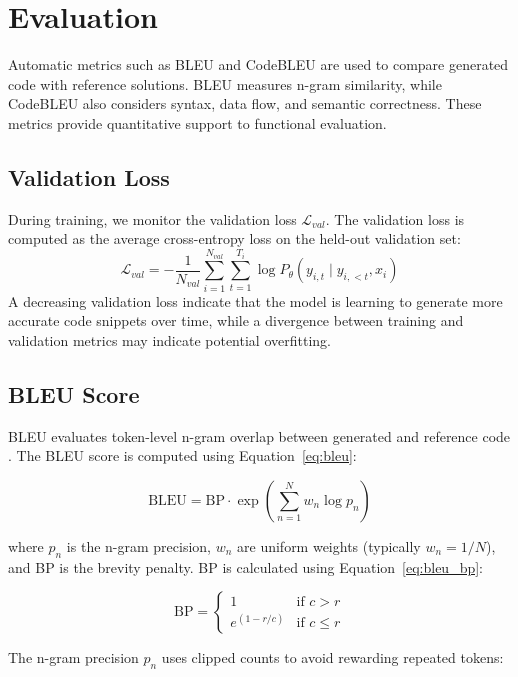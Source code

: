 \section{Evaluation}
Automatic metrics such as BLEU and CodeBLEU are used to compare generated code
with reference solutions. BLEU measures n-gram similarity, while CodeBLEU also
considers syntax, data flow, and semantic correctness. These metrics provide quantitative
support to functional evaluation.
\subsection{Validation Loss}
During training, we monitor the validation loss $\mathcal{L}_{val}$. The validation loss is computed as the average cross-entropy loss on the held-out validation set:
\begin{equation}
\mathcal{L}_{val} = - \frac{1}{N_{val}} \sum_{i=1}^{N_{val}} \sum_{t=1}^{T_i} \log P_\theta(y_{i,t} \mid y_{i,<t}, x_i)
\end{equation}
A decreasing validation loss indicate that the model is learning to generate more accurate code snippets over time, while a divergence between training and validation metrics may indicate potential overfitting.

\subsection{BLEU Score}
BLEU evaluates token-level n-gram overlap between generated and reference code \cite{Papineni2002}. 
The BLEU score is computed using Equation~\eqref{eq:bleu}:

\begin{equation}\label{eq:bleu}
	\text{BLEU} = \text{BP} \cdot \exp\left(\sum_{n=1}^{N} w_n \log p_n\right)
\end{equation}

where $p_n$ is the n-gram precision, $w_n$ are uniform weights (typically $w_n = 1/N$), and BP is the brevity penalty. 
BP is calculated using Equation~\eqref{eq:bleu_bp}:

\begin{equation}\label{eq:bleu_bp}
	\text{BP} =
	\begin{cases} 
	1 & \text{if } c > r \\
	e^{(1-r/c)} & \text{if } c \leq r
	\end{cases}
\end{equation}

The n-gram precision $p_n$ uses clipped counts to avoid rewarding repeated tokens:

